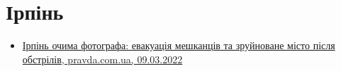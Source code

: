  
 
 
 
 
\section{Ірпінь}

\begin{itemize} %
\item \hyperlink{09_03_2022.stz.news.ua.pravda.1.irpen}{%
Ірпінь очима фотографа: евакуація мешканців та зруйноване місто після обстрілів, %
pravda.com.ua, 09.03.2022%
}

\end{itemize} %
